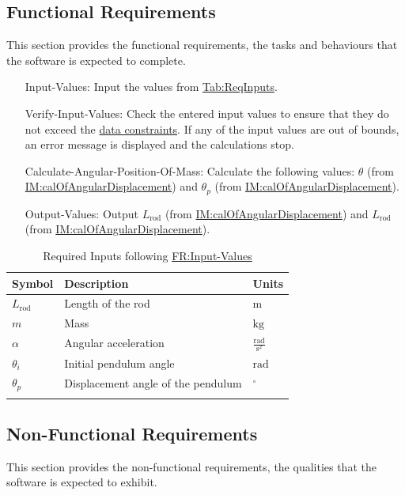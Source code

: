 \documentclass[12pt]{article}
\begin{document}
\subsection{Functional Requirements}
\label{Sec:FRs}
This section provides the functional requirements, the tasks and behaviours that the software is expected to complete.

\begin{itemize}
\item[Input-Values:\phantomsection\label{inputValues}]{Input the values from \hyperref[Table:ReqInputs]{Tab:ReqInputs}.}
\item[Verify-Input-Values:\phantomsection\label{verifyInptVals}]{Check the entered input values to ensure that they do not exceed the \hyperref[Sec:DataConstraints]{data constraints}. If any of the input values are out of bounds, an error message is displayed and the calculations stop.}
\item[Calculate-Angular-Position-Of-Mass:\phantomsection\label{calcAngPos}]{Calculate the following values: $θ$ (from \hyperref[IM:calOfAngularDisplacement]{IM:calOfAngularDisplacement}) and ${θ_{p}}$ (from \hyperref[IM:calOfAngularDisplacement]{IM:calOfAngularDisplacement}).}
\item[Output-Values:\phantomsection\label{outputValues}]{Output ${L_{\text{rod}}}$ (from \hyperref[IM:calOfAngularDisplacement]{IM:calOfAngularDisplacement}) and ${L_{\text{rod}}}$ (from \hyperref[IM:calOfAngularDisplacement]{IM:calOfAngularDisplacement}).}
\end{itemize}
\begin{longtable}{l l l}
\toprule
\textbf{Symbol} & \textbf{Description} & \textbf{Units}
\\
\midrule
\endhead
${L_{\text{rod}}}$ & Length of the rod & ${\text{m}}$
\\
$m$ & Mass & ${\text{kg}}$
\\
$α$ & Angular acceleration & $\frac{\text{rad}}{\text{s}^{2}}$
\\
${θ_{i}}$ & Initial pendulum angle & ${\text{rad}}$
\\
${θ_{p}}$ & Displacement angle of the pendulum & ${{}^{\circ}}$
\\
\bottomrule
\caption{Required Inputs following \hyperref[inputValues]{FR:Input-Values}}
\label{Table:ReqInputs}
\end{longtable}
\subsection{Non-Functional Requirements}
\label{Sec:NFRs}
This section provides the non-functional requirements, the qualities that the software is expected to exhibit.
\end{document}
